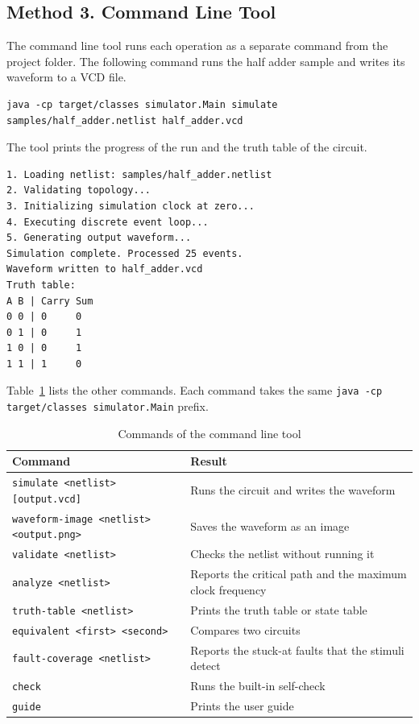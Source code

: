 \subsection{Method 3. Command Line Tool}
\label{sec:cli}

The command line tool runs each operation as a separate command from the project folder.
The following command runs the half adder sample and writes its waveform to a VCD file.

\begin{lstlisting}
java -cp target/classes simulator.Main simulate samples/half_adder.netlist half_adder.vcd
\end{lstlisting}

The tool prints the progress of the run and the truth table of the circuit.

\begin{lstlisting}
1. Loading netlist: samples/half_adder.netlist
2. Validating topology...
3. Initializing simulation clock at zero...
4. Executing discrete event loop...
5. Generating output waveform...
Simulation complete. Processed 25 events.
Waveform written to half_adder.vcd
Truth table:
A B | Carry Sum
0 0 | 0     0
0 1 | 0     1
1 0 | 0     1
1 1 | 1     0
\end{lstlisting}

Table~\ref{tab:commands} lists the other commands.
Each command takes the same \texttt{java -cp target/classes simulator.Main} prefix.

\begin{table}[H]
\centering
\small
\caption{Commands of the command line tool}
\label{tab:commands}
\begin{tabular}{>{\raggedright\arraybackslash}p{6.6cm}>{\raggedright\arraybackslash}p{8.4cm}}
\toprule
\textbf{Command} & \textbf{Result} \\
\midrule
\texttt{simulate <netlist> [output.vcd]} & Runs the circuit and writes the waveform \\
\texttt{waveform-image <netlist> <output.png>} & Saves the waveform as an image \\
\texttt{validate <netlist>} & Checks the netlist without running it \\
\texttt{analyze <netlist>} & Reports the critical path and the maximum clock frequency \\
\texttt{truth-table <netlist>} & Prints the truth table or state table \\
\texttt{equivalent <first> <second>} & Compares two circuits \\
\texttt{fault-coverage <netlist>} & Reports the stuck-at faults that the stimuli detect \\
\texttt{check} & Runs the built-in self-check \\
\texttt{guide} & Prints the user guide \\
\bottomrule
\end{tabular}
\end{table}

